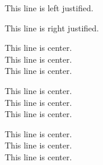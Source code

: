 \documentclass[11pt]{article}
\begin{document}
\begin{flushleft}This line is left justified.\end{flushleft}

\begin{flushright}This line is right justified.\end{flushright}


\centering
This line is center.\\
This line is center.\\
This line is center.

\Large
This line is center.\\
This line is center.\\
This line is center.


\tiny
This line is center.\\
This line is center.\\
This line is center.
\end{document}
